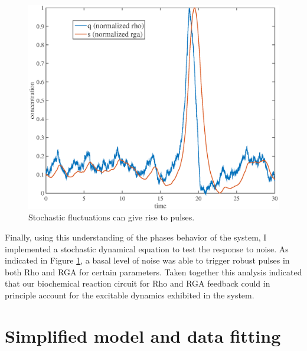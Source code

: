 \begin{figure}[h!]
	\centering
	\includegraphics[width=\hsize]{pulse/randomized_simulation.eps}
	\caption{\label{fig:pulse_rando} Stochastic fluctuations can give rise to pulses. }
\end{figure}

Finally, using this understanding of the phases behavior of the system, I implemented a stochastic dynamical equation to test the response to noise.  As indicated in Figure \ref{fig:pulse_rando}, a basal level of noise was able to trigger robust pulses in both Rho and RGA for certain parameters. Taken together this analysis indicated that our biochemical reaction circuit for Rho and RGA feedback could in principle account for the excitable dynamics exhibited in the system.

\section{Simplified model and data fitting}
